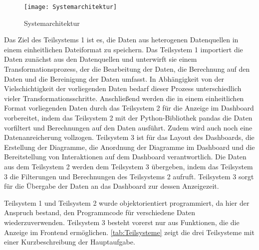     \begin{figure}[H]
        \centering
            \texttt{[image: Systemarchitektur]}
            \caption{Systemarchitektur}
            \label{fig:Systemarchitektur}
    \end{figure}

    Das Ziel des Teilsystems 1 ist es, die Daten aus heterogenen Datenquellen in einem einheitlichen Dateiformat zu speichern.
    Das Teilsystem 1 importiert die Daten zunächst aus den Datenquellen und unterwirft sie einem Transformationsprozess, der die Bearbeitung der Daten, die Berechnung
    auf den Daten und die Bereinigung der Daten umfasst. In Abhängigkeit von der Vielschichtigkeit der vorliegenden Daten bedarf dieser Prozess unterschiedlich vieler Transformationsschritte.  
    Anschließend werden die in einem einheitlichen Format vorliegenden Daten durch das Teilsystem 2 
    für die Anzeige im Dashboard vorbereitet, indem das Teilsystem 2 mit der Python-Bibliothek pandas die Daten vorfiltert und Berechnungen auf den Daten ausführt. 
    Zudem wird auch noch eine Datenanreicherung vollzogen. Teilsystem 3 ist für das Layout des Dashboards, die Erstellung der Diagramme, die Anordnung der Diagramme im Dashboard und 
    die Bereitstellung von Interaktionen auf dem Dashboard verantwortlich. Die Daten aus dem Teilsystem 2 werden dem Teilsystem 3 übergeben,
    indem das Teilsystem 3 die Filterungen und Berechnungen des Teilsystems 2 aufruft. Teilsystem 3 sorgt für die Übergabe der Daten an das Dashboard zur dessen Anzeigezeit.
    
    Teilsystem 1 und Teilsystem 2 wurde objektorientiert programmiert, da hier der Anspruch bestand, den Programmcode
    für verschiedene Daten wiederzuverwenden. Teilsystem 3 besteht vorerst nur aus Funktionen, die die Anzeige im Frontend ermöglichen.
    \autoref{tab:Teilsysteme} zeigt die drei Teilsysteme mit einer Kurzbeschreibung der Hauptaufgabe.

